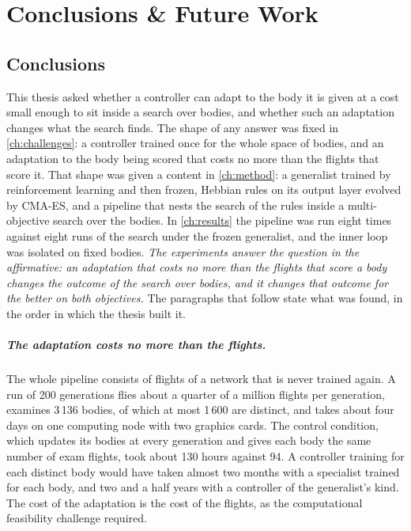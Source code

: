 \chapter{Conclusions \& Future Work}
\label{ch:conclusions}

\section{Conclusions}
\label{sec:conclusions}

This thesis asked whether a controller can adapt to the body it is given at a cost small enough to sit inside a search over bodies, and whether such an adaptation changes what the search finds. The shape of any answer was fixed in \autoref{ch:challenges}: a controller trained once for the whole space of bodies, and an adaptation to the body being scored that costs no more than the flights that score it. That shape was given a content in \autoref{ch:method}: a generalist trained by reinforcement learning and then frozen, Hebbian rules on its output layer evolved by CMA-ES, and a pipeline that nests the search of the rules inside a multi-objective search over the bodies. In \autoref{ch:results} the pipeline was run eight times against eight runs of the search under the frozen generalist, and the inner loop was isolated on fixed bodies. \emph{The experiments answer the question in the affirmative: an adaptation that costs no more than the flights that score a body changes the outcome of the search over bodies, and it changes that outcome for the better on both objectives.} The paragraphs that follow state what was found, in the order in which the thesis built it.

\paragraph{The adaptation costs no more than the flights.} The whole pipeline consists of flights of a network that is never trained again. A run of 200 generations flies about a quarter of a million flights per generation, examines 3\,136 bodies, of which at most 1\,600 are distinct, and takes about four days on one computing node with two graphics cards. The control condition, which updates its bodies at every generation and gives each body the same number of exam flights, took about 130 hours against 94. A controller training for each distinct body would have taken almost two months with a specialist trained for each body, and two and a half years with a controller of the generalist's kind. The cost of the adaptation is the cost of the flights, as the computational feasibility challenge required.

